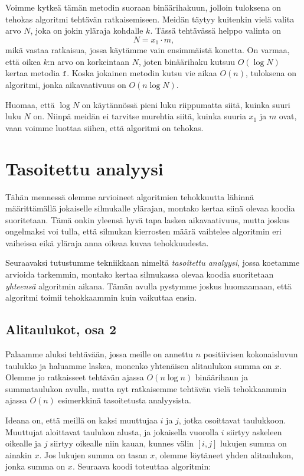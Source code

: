 Voimme kytkeä tämän metodin suoraan binäärihakuun,
jolloin tuloksena on tehokas algoritmi tehtävän ratkaisemiseen.
Meidän täytyy kuitenkin vielä valita arvo $N$,
joka on jokin yläraja kohdalle $k$.
Tässä tehtävässä helppo valinta on
\[N = x_1 \cdot m,\]
mikä vastaa ratkaisua, jossa käytämme vain ensimmäistä konetta.
On varmaa, että oikea $k$:n arvo on korkeintaan $N$,
joten binäärihaku kutsuu $O(\log N)$ kertaa metodia $\texttt{f}$.
Koska jokainen metodin kutsu vie aikaa $O(n)$,
tuloksena on algoritmi, jonka aikavaativuus on $O(n \log N)$.

Huomaa, että $\log N$ on käytännössä pieni luku riippumatta
siitä, kuinka suuri luku $N$ on.
Niinpä meidän ei tarvitse murehtia siitä,
kuinka suuria $x_1$ ja $m$ ovat,
vaan voimme luottaa siihen, että algoritmi on tehokas.

\section{Tasoitettu analyysi}

Tähän mennessä olemme arvioineet algoritmien tehokkuutta
lähinnä määrit\-tämällä jokaiselle silmukalle ylärajan,
montako kertaa siinä olevaa koodia suoritetaan.
Tämä onkin yleensä hyvä tapa laskea aikavaativuus,
mutta joskus ongelmaksi voi tulla, että silmukan kierrosten
määrä vaihtelee algoritmin eri vaiheissa eikä yläraja
anna oikeaa kuvaa tehokkuudesta.

Seuraavaksi tutustumme tekniikkaan nimeltä
\emph{tasoitettu analyysi}, jossa koetamme arvioida tarkemmin,
montako kertaa silmukassa olevaa koodia suoritetaan
\emph{yhteensä} algoritmin aikana.
Tämän avulla pystymme joskus huomaamaan, että algoritmi
toimii tehokkaammin kuin vaikuttaa ensin.

\subsection{Alitaulukot, osa 2}

Palaamme aluksi tehtävään, jossa meille on annettu
$n$ positiivisen kokonaisluvun taulukko ja haluamme laskea,
monenko yhtenäisen alitaulukon summa on $x$.
Olemme jo ratkaisseet tehtävän ajassa $O(n \log n)$
binäärihaun ja summataulukon avulla,
mutta nyt ratkaisemme tehtävän vielä tehokkaammin
ajassa $O(n)$ esimerkkinä tasoitetusta analyysista.

Ideana on, että meillä on kaksi muuttujaa $i$ ja $j$,
jotka osoittavat taulukkoon.
Muuttujat aloittavat taulukon alusta,
ja jokaisella vuorolla $i$ siirtyy askeleen oikealle
ja $j$ siirtyy oikealle niin kauan, kunnes välin $[i,j]$
lukujen summa on ainakin $x$.
Jos lukujen summa on tasan $x$, olemme löytäneet yhden
alitaulukon, jonka summa on $x$.
Seuraava koodi toteuttaa algoritmin:

